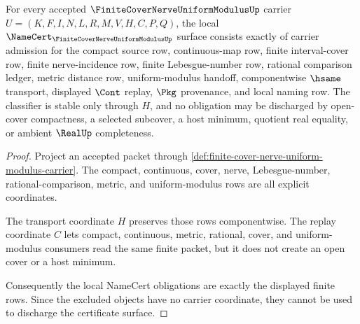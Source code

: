 \begin{theorem}
\label{thm:finite-cover-nerve-uniform-modulus-obligations}
For every accepted $\FiniteCoverNerveUniformModulusUp$ carrier $U=(K,F,I,N,L,R,M,V,H,C,P,Q)$, the local $\NameCert_{\FiniteCoverNerveUniformModulusUp}$ surface consists exactly of carrier admission for the compact source row, continuous-map row, finite interval-cover row, finite nerve-incidence row, finite Lebesgue-number row, rational comparison ledger, metric distance row, uniform-modulus handoff, componentwise $\hsame$ transport, displayed $\Cont$ replay, $\Pkg$ provenance, and local naming row. The classifier is stable only through $H$, and no obligation may be discharged by open-cover compactness, a selected subcover, a host minimum, quotient real equality, or ambient $\RealUp$ completeness.
\end{theorem}
\begin{proof}
Project an accepted packet through \autoref{def:finite-cover-nerve-uniform-modulus-carrier}. The compact, continuous, cover, nerve, Lebesgue-number, rational-comparison, metric, and uniform-modulus rows are all explicit coordinates.

The transport coordinate $H$ preserves those rows componentwise. The replay coordinate $C$ lets compact, continuous, metric, rational, cover, and uniform-modulus consumers read the same finite packet, but it does not create an open cover or a host minimum.

Consequently the local NameCert obligations are exactly the displayed finite rows. Since the excluded objects have no carrier coordinate, they cannot be used to discharge the certificate surface.
\end{proof}

